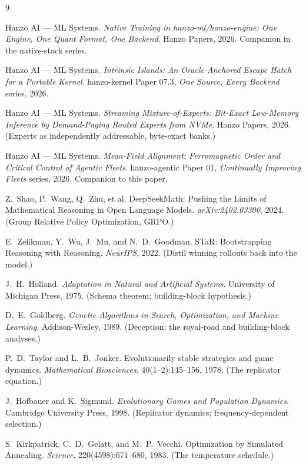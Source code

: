 \documentclass[11pt]{article}
\begin{document}
\begin{thebibliography}{9}

Hanzo AI --- ML Systems.
\newblock \emph{Native Training in hanzo-ml/hanzo-engine: One Engine, One Quant Format, One Backend}.
\newblock Hanzo Papers, 2026. Companion in the native-stack series.

Hanzo AI --- ML Systems.
\newblock \emph{Intrinsic Islands: An Oracle-Anchored Escape Hatch for a Portable Kernel}.
\newblock hanzo-kernel Paper 07.3, \emph{One Source, Every Backend} series, 2026.

Hanzo AI --- ML Systems.
\newblock \emph{Streaming Mixture-of-Experts: Bit-Exact Low-Memory Inference by Demand-Paging Routed Experts
from NVMe}.
\newblock Hanzo Papers, 2026. (Experts as independently addressable, byte-exact banks.)

Hanzo AI --- ML Systems.
\newblock \emph{Mean-Field Alignment: Ferromagnetic Order and Critical Control of Agentic Fleets}.
\newblock hanzo-agentic Paper 01, \emph{Continually Improving Fleets} series, 2026. Companion to this paper.

Z.\ Shao, P.\ Wang, Q.\ Zhu, et al.
\newblock DeepSeekMath: Pushing the Limits of Mathematical Reasoning in Open Language Models.
\newblock \emph{arXiv:2402.03300}, 2024. (Group Relative Policy Optimization, GRPO.)

E.\ Zelikman, Y.\ Wu, J.\ Mu, and N.\ D.\ Goodman.
\newblock STaR: Bootstrapping Reasoning with Reasoning.
\newblock \emph{NeurIPS}, 2022. (Distil winning rollouts back into the model.)

J.\ H.\ Holland.
\newblock \emph{Adaptation in Natural and Artificial Systems}.
\newblock University of Michigan Press, 1975. (Schema theorem; building-block hypothesis.)

D.\ E.\ Goldberg.
\newblock \emph{Genetic Algorithms in Search, Optimization, and Machine Learning}.
\newblock Addison-Wesley, 1989. (Deception; the royal-road and building-block analyses.)

P.\ D.\ Taylor and L.\ B.\ Jonker.
\newblock Evolutionarily stable strategies and game dynamics.
\newblock \emph{Mathematical Biosciences}, 40(1--2):145--156, 1978. (The replicator equation.)

J.\ Hofbauer and K.\ Sigmund.
\newblock \emph{Evolutionary Games and Population Dynamics}.
\newblock Cambridge University Press, 1998. (Replicator dynamics; frequency-dependent selection.)

S.\ Kirkpatrick, C.\ D.\ Gelatt, and M.\ P.\ Vecchi.
\newblock Optimization by Simulated Annealing.
\newblock \emph{Science}, 220(4598):671--680, 1983. (The temperature schedule.)

\end{thebibliography}
\end{document}
